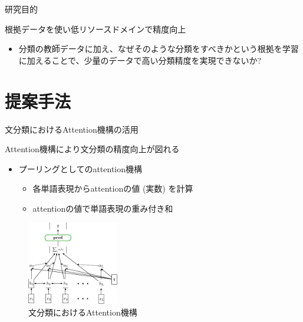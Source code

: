 \begin{frame}{研究目的}
\begin{lead}
    根拠データを使い低リソースドメインで精度向上
\end{lead}
\begin{itemize}
\item 分類の教師データに加え、なぜそのような分類をすべきかという\alert{根拠を学習に加える}ことで、\alert{少量のデータで高い分類精度}を実現できないか?
\end{itemize}
\end{frame}

\section{提案手法}
\frame[standout]{\insertsection}

\begin{frame}{文分類におけるAttention機構の活用}
\begin{lead}
    Attention機構により文分類の精度向上が図れる
\end{lead}
\begin{itemize}
\item プーリングとしてのattention機構
\begin{itemize}
    \item 各単語表現からattentionの値 (実数) を計算
    \item attentionの値で単語表現の重み付き和
\end{itemize}
\end{itemize}

\vspace*{-8pt}
\begin{figure}[H]
  \centering
  \includegraphics[width=40mm]{fig/attention_classifier.pdf}
  \caption{文分類におけるAttention機構\cite{bao_2018}}
\end{figure}
\end{frame}

